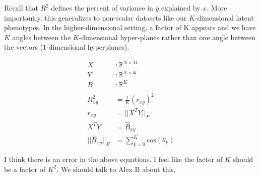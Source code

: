 \documentclass{article}
\newcommand{\R}{\mathbb{R}}
\begin{document}
Recall that $R^2$ defines the percent of variance in $y$ explained by $x$. More importantly, this
generalizes to non-scalar datasets like our $K$-dimensional latent phenotypes. In the
higher-dimensional setting, a factor of K appears and we have $K$ angles between the $K$-dimensional
hyper-planes rather than one angle between the vectors (1-dimensional hyperplanes).

\begin{align*}
X &: \R^{N \times M} \\
Y &: \R^{N \times K} \\
B &: \R^{K} \\
\\
R^2_{xy} &= \frac{1}{K}(r_{xy})^2 \\
  r_{xy} &= ||X^T Y||_F \\
  X^T Y &= \widehat{B}_{xy} \\
||\widehat{B}_{xy}||_F &= \sum_{k=0}^K \text{cos}(\theta_{k})
\end{align*}

I think there is an error in the above equations. I feel like the factor of $K$ should be a factor
of $K^2$. We should talk to Alex B about this.
\end{document}
